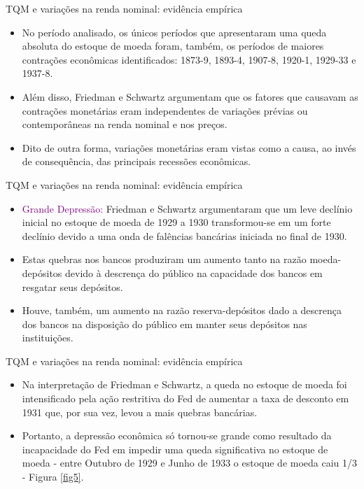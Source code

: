 \documentclass[10pt]{beamer}
\begin{document}
\begin{frame}{TQM e variações na renda nominal: evidência empírica}
    \begin{itemize}
        \item No período analisado, os únicos períodos que apresentaram uma queda absoluta do estoque de moeda foram, também, os períodos de maiores contrações econômicas identificados: 1873-9, 1893-4, 1907-8, 1920-1, 1929-33 e 1937-8.
        \bigskip
        \item Além disso, Friedman e Schwartz argumentam que os fatores que causavam as contrações monetárias eram independentes de variações prévias ou contemporâneas na renda nominal e nos preços.
        \bigskip
        \item Dito de outra forma, variações monetárias eram vistas como a causa, ao invés de consequência, das principais recessões econômicas.
    \end{itemize}
\end{frame}

\begin{frame}{TQM e variações na renda nominal: evidência empírica}
    \begin{itemize}
        \item \textcolor{purple}{Grande Depressão:} Friedman e Schwartz argumentaram que um leve declínio inicial no estoque de moeda de 1929 a 1930 transformou-se em um forte declínio devido a uma onda de falências bancárias iniciada no final de 1930.
        \bigskip
        \item Estas quebras nos bancos produziram um aumento tanto na razão moeda-depósitos devido à descrença do público na capacidade dos bancos em resgatar seus depósitos.
        \bigskip
        \item Houve, também, um aumento na razão reserva-depósitos dado a descrença dos bancos na disposição do público em manter seus depósitos nas instituições.
    \end{itemize}
\end{frame}

\begin{frame}{TQM e variações na renda nominal: evidência empírica}
    \begin{itemize}
        \item Na interpretação de Friedman e Schwartz, a queda no estoque de moeda foi intensificado pela ação restritiva do Fed de aumentar a taxa de desconto em 1931 que, por sua vez, levou a mais quebras bancárias.
        \bigskip
        \item Portanto, a depressão econômica só tornou-se grande como resultado da incapacidade do Fed em impedir uma queda significativa no estoque de moeda - entre Outubro de 1929 e Junho de 1933 o estoque de moeda caiu 1/3 - Figura \ref{fig5}.
    \end{itemize}
\end{frame}
\end{document}
